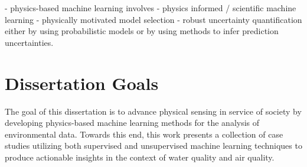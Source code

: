 - physics-based machine learning involves
  - physics informed / scientific machine learning
  - physically motivated model selection
  - robust uncertainty quantification either by using probabilistic models or by
  using methods to infer prediction uncertainties.










\section{Dissertation Goals}

The goal of this dissertation is to advance physical sensing in service of
society by developing physics-based machine learning methods for the analysis
of environmental data. Towards this end, this work presents a collection of case
studies utilizing both supervised and unsupervised machine learning techniques
to produce actionable insights in the context of water quality and air quality.


